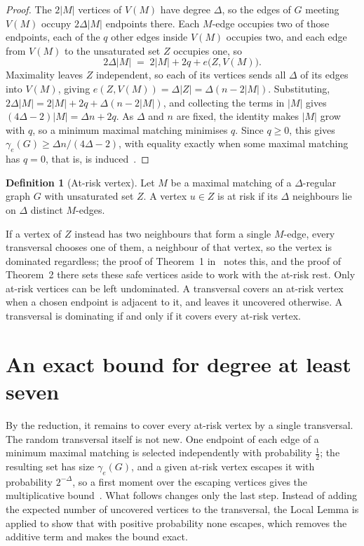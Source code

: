 \documentclass[11pt]{article}
\theoremstyle{definition}
\newtheorem{definition}{Definition}
\theoremstyle{remark}
\newcommand{\edom}{\gamma_{e}}
\begin{document}
\begin{proof}
The $2|M|$ vertices of $V(M)$ have degree $\Delta$, so the edges of $G$ meeting
$V(M)$ occupy $2\Delta|M|$ endpoints there. Each $M$-edge occupies two of those
endpoints, each of the $q$ other edges inside $V(M)$ occupies two, and each edge
from $V(M)$ to the unsaturated set $Z$ occupies one, so
\[
  2\Delta|M| \;=\; 2|M| + 2q + e\bigl(Z, V(M)\bigr).
\]
Maximality leaves $Z$ independent, so each of its vertices sends all $\Delta$ of
its edges into $V(M)$, giving $e(Z, V(M)) = \Delta|Z| = \Delta(n - 2|M|)$.
Substituting, $2\Delta|M| = 2|M| + 2q + \Delta(n - 2|M|)$, and collecting the
terms in $|M|$ gives $(4\Delta - 2)|M| = \Delta n + 2q$. As $\Delta$ and $n$ are
fixed, the identity makes $|M|$ grow with $q$, so a minimum maximal matching
minimises $q$. Since $q \ge 0$, this gives $\edom(G) \ge \Delta n/(4\Delta - 2)$,
with equality exactly when some maximal matching has $q = 0$, that is, is
induced~\cite[Lemma~3(i)]{BasteMMM2021}.
\end{proof}

\begin{definition}[At-risk vertex]\label{def:atrisk}
Let $M$ be a maximal matching of a $\Delta$-regular graph $G$ with unsaturated set
$Z$. A vertex $u \in Z$ is at risk if its $\Delta$ neighbours lie on $\Delta$
distinct $M$-edges.
\end{definition}

\noindent
If a vertex of $Z$ instead has two neighbours that form a single $M$-edge, every
transversal chooses one of them, a neighbour of that vertex, so the vertex is
dominated regardless; the proof of Theorem~1 in~\cite{Baste2020} notes this, and
the proof of Theorem~2 there sets these safe vertices aside to work with the
at-risk rest. Only at-risk vertices can be left undominated. A transversal
covers an at-risk vertex when a chosen endpoint is adjacent to it, and
leaves it uncovered otherwise. A transversal is dominating if and only if
it covers every at-risk vertex.

\section{An exact bound for degree at least seven}\label{sec:lll}

By the reduction, it remains to cover every at-risk vertex by a single
transversal. The random transversal itself is not new. One endpoint of each
edge of a minimum maximal matching is selected independently with probability
$\tfrac12$; the resulting set has size $\edom(G)$, and a given at-risk vertex
escapes it with probability $2^{-\Delta}$, so a first moment over the escaping
vertices gives the multiplicative bound~\cite{Baste2020}. What follows changes
only the last step. Instead of adding the expected number of uncovered vertices
to the transversal, the Local Lemma is applied to show that with positive
probability none escapes, which removes the additive term and makes the bound
exact.
\end{document}
